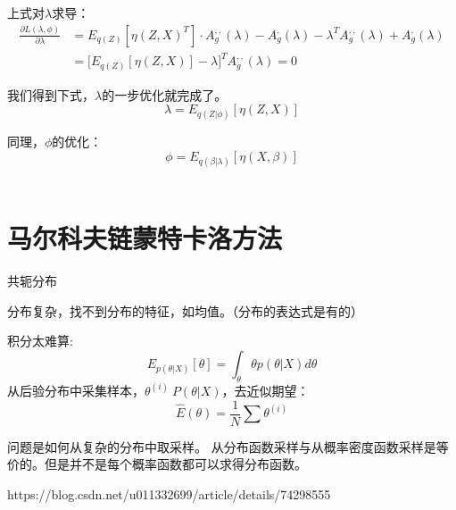 \documentclass[UTF8]{ctexart} %
\begin{document}
					上式对$\lambda$求导：
						\[\begin{aligned}
						\frac{\partial L(\lambda,\phi)}{\partial \lambda} &= E_{q(Z)}[\eta(Z,X)^T]\cdot A_g^{,,}(\lambda)-A_g^,(\lambda)-\lambda^T A_g^{,,}(\lambda)+A_g^,(\lambda)\\
						&=\Bigg[ E_{q(Z)}[\eta(Z,X)] -\lambda\Bigg]^TA_g^{,,}(\lambda)=0
						\end{aligned}\]
						
					我们得到下式，$\lambda$的一步优化就完成了。
						\[\lambda = E_{q(Z|\phi)}[\eta(Z,X)]\]
					
					同理，$\phi$的优化：
						\[\phi = E_{q(\beta|\lambda)}[\eta(X,\beta)]\]\\
						
						
		\section{马尔科夫链蒙特卡洛方法}
				共轭分布
				
				分布复杂，找不到分布的特征，如均值。（分布的表达式是有的）
				
				积分太难算:
				\[E_{p(\theta|X)}[\theta] = \int_{\theta}\theta p(\theta|X)d\theta\]
				从后验分布中采集样本，$\theta^{(i)}~P(\theta|X)$，去近似期望：
				\[\hat{E}(\theta) = \frac{1}{N}\sum\theta^{(i)}\]
				
				
				问题是如何从复杂的分布中取采样。
				从分布函数采样与从概率密度函数采样是等价的。但是并不是每个概率函数都可以求得分布函数。
				
				https://blog.csdn.net/u011332699/article/details/74298555\
\end{document}
